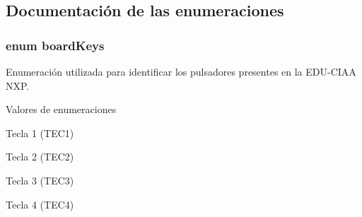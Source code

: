 \subsection{Documentación de las enumeraciones}
\subsubsection[{\texorpdfstring{board\+Keys}{boardKeys}}]{\setlength{\rightskip}{0pt plus 5cm}enum {\bf board\+Keys}}\hypertarget{group__hardware_ga8d70125ca4047f0f7ea513cd8568953d}{}\label{group__hardware_ga8d70125ca4047f0f7ea513cd8568953d}


Enumeración utilizada para identificar los pulsadores presentes en la E\+D\+U-\/\+C\+I\+AA N\+XP. 

\begin{Desc}
\item[Valores de enumeraciones]\par
\begin{description}
\item[{\em 
key1\hypertarget{group__hardware_gga8d70125ca4047f0f7ea513cd8568953da483a28cafb544915d9cd44f2c69fc706}{}\label{group__hardware_gga8d70125ca4047f0f7ea513cd8568953da483a28cafb544915d9cd44f2c69fc706}
}]Tecla 1 (T\+E\+C1) \item[{\em 
key2\hypertarget{group__hardware_gga8d70125ca4047f0f7ea513cd8568953dab8d9f65fc5604a8b8a0cdcbaf03bbbe0}{}\label{group__hardware_gga8d70125ca4047f0f7ea513cd8568953dab8d9f65fc5604a8b8a0cdcbaf03bbbe0}
}]Tecla 2 (T\+E\+C2) \item[{\em 
key3\hypertarget{group__hardware_gga8d70125ca4047f0f7ea513cd8568953da376c29473ae1a854ff46b2b171985093}{}\label{group__hardware_gga8d70125ca4047f0f7ea513cd8568953da376c29473ae1a854ff46b2b171985093}
}]Tecla 3 (T\+E\+C3) \item[{\em 
key4\hypertarget{group__hardware_gga8d70125ca4047f0f7ea513cd8568953da84011848209e666e74469d6dfba542eb}{}\label{group__hardware_gga8d70125ca4047f0f7ea513cd8568953da84011848209e666e74469d6dfba542eb}
}]Tecla 4 (T\+E\+C4) \end{description}
\end{Desc}


